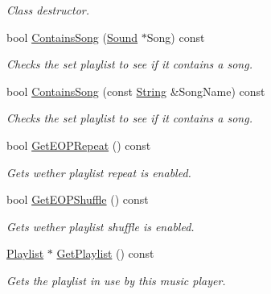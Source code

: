\begin{DoxyCompactItemize}
\begin{DoxyCompactList}\small\item\em Class destructor. \item\end{DoxyCompactList}\item 
bool \hyperlink{classMezzanine_1_1Audio_1_1MusicPlayer_a0008726842f3562c1c6de2885dd0c837}{ContainsSong} (\hyperlink{classMezzanine_1_1Audio_1_1Sound}{Sound} $\ast$Song) const 
\begin{DoxyCompactList}\small\item\em Checks the set playlist to see if it contains a song. \item\end{DoxyCompactList}\item 
bool \hyperlink{classMezzanine_1_1Audio_1_1MusicPlayer_a4b4db10e2b7a29a0093337be44963f75}{ContainsSong} (const \hyperlink{namespaceMezzanine_acf9fcc130e6ebf08e3d8491aebcf1c86}{String} \&SongName) const 
\begin{DoxyCompactList}\small\item\em Checks the set playlist to see if it contains a song. \item\end{DoxyCompactList}\item 
bool \hyperlink{classMezzanine_1_1Audio_1_1MusicPlayer_a1cb8dcb219f5c3f2fa8f4ddb1cd2bfc8}{GetEOPRepeat} () const 
\begin{DoxyCompactList}\small\item\em Gets wether playlist repeat is enabled. \item\end{DoxyCompactList}\item 
bool \hyperlink{classMezzanine_1_1Audio_1_1MusicPlayer_a3dee1170bf17a44dd6be88240013445c}{GetEOPShuffle} () const 
\begin{DoxyCompactList}\small\item\em Gets wether playlist shuffle is enabled. \item\end{DoxyCompactList}\item 
\hyperlink{classMezzanine_1_1Audio_1_1Playlist}{Playlist} $\ast$ \hyperlink{classMezzanine_1_1Audio_1_1MusicPlayer_af6cfa25522094f4e2881aab04e918136}{GetPlaylist} () const 
\begin{DoxyCompactList}\small\item\em Gets the playlist in use by this music player. \item\end{DoxyCompactList}\item 

\end{DoxyCompactItemize}
